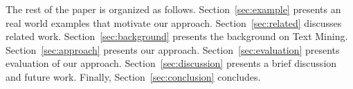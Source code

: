 The rest of the paper is organized as follows.
Section~\ref{sec:example} presents an real world examples that motivate our approach. Section~\ref{sec:related} discusses related work.
Section~\ref{sec:background} presents the  background on Text Mining.
Section~\ref{sec:approach} presents our approach.
Section~\ref{sec:evaluation} presents evaluation of our approach.
Section~\ref{sec:discussion} presents a brief discussion and future work.
Finally, Section~\ref{sec:conclusion} concludes.



